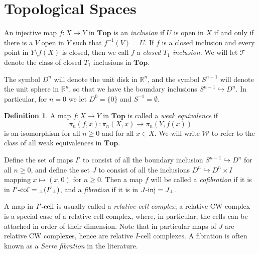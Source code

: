 \documentclass{amsart}
\theoremstyle{plain}
\theoremstyle{definition}
\newtheorem{definition}[theorem]{Definition}
\newcommand{\Top}{\mbf{Top}}
\newcommand{\sseq}{\subseteq}
\newcommand{\0}{\mathbf{0}}
\newcommand{\bR}{\mathbb{R}}
\newcommand{\into}{\hookrightarrow}
\newcommand{\cT}{\mathcal T}
\newcommand{\cW}{\mathcal W}
\newcommand{\mbf}[1]{\mathbf{#1}}
\renewcommand{\(}{\left(}
\renewcommand{\)}{\right)}
\newcommand{\inj}{\text-\mathrm{inj}}
\newcommand{\cell}{\text-\mathrm{cell}}
\newcommand{\cof}{\text-\mathrm{cof}}
\begin{document}
\section{Topological Spaces}

An injective map $f:X\to Y$ in $\Top$ is an \textit{inclusion} if $U$ is open in $X$ if and only if there is a $V$ open in $Y$ such that $f^{-1}(V)=U$. If $f$ is a closed inclusion and every point in $Y\setminus f(X)$ is closed, then we call $f$ a \textit{closed $T_1$ inclusion}. We will let $\cT$ denote the class of closed $T_1$ inclusions in $\Top$.

The symbol $D^n$ will denote the unit disk in $\bR^n$, and the symbol $S^{n-1}$ will denote the unit sphere in $\bR^n$, so that we have the boundary inclusions $S^{n-1}\into D^n$. In particular, for $n=0$ we let $D^0=\{0\}$ and $S^{-1}=\emptyset$.

\begin{definition}
  A map $f:X\to Y$ in $\Top$ is called a \textit{weak equivalence} if
  \[\pi_n(f,x):\pi_n(X,x)\to\pi_n(Y,f(x))\]
  is an isomorphism for all $n\geq0$ and for all $x\in X$. We will write $\cW$ to refer to the class of all weak equivalences in $\Top$.

  Define the set of maps $I'$ to consist of all the boundary inclusion $S^{n-1}\into D^n$ for all $n\geq0$, and define the set $J$ to consist of all the inclusions $D^n\into D^n\times I$ mapping $x\mapsto(x,0)$ for $n\geq0$. Then a map $f$ will be called a \textit{cofibration} if it is in $I'\cof={_\perp({I'}_\perp)}$, and a \textit{fibration} if it is in $J\inj=J_\perp$.

  A map in $I'\cell$ is usually called a \textit{relative cell complex}; a relative CW-complex is a special case of a relative cell complex, where, in particular, the cells can be attached in order of their dimension. Note that in particular maps of $J$ are relative CW complexes, hence are relative $I$-cell complexes. 
  A fibration is often known as a \textit{Serre fibration} in the literature.
\end{definition}
\end{document}

